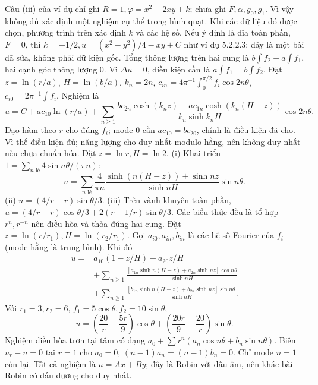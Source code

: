 Câu (iii) của ví dụ chỉ ghi $R=1,\varphi=x^2-2xy+k$; chưa ghi $F,\alpha,g_0,g_1$. Vì vậy không đủ xác định một nghiệm cụ thể trong hình quạt. Khi các dữ liệu đó được chọn, phương trình trên xác định $k$ và các hệ số. Nếu ý định là đĩa toàn phần, $F=0$, thì $k=-1/2,u=(x^2-y^2)/4-xy+C$ như ví dụ 5.2.2.3; đây là một bài đã sửa, không phải dữ kiện gốc.
Tổng thông lượng trên hai cung là $b\int f_2-a\int f_1$, hai cạnh góc thông lượng 0. Vì $\Delta u=0$, điều kiện cần là $a\int f_1=b\int f_2$. Đặt $z=\ln(r/a)$, $H=\ln(b/a)$, $k_n=2n$, $c_{in}=4\pi^{-1}\int_0^{\pi/2}f_i\cos2n\theta$, $c_{i0}=2\pi^{-1}\int f_i$. Nghiệm là
\[u=C+ac_{10}\ln(r/a)+\sum_{n\ge1}\frac{bc_{2n}\cosh(k_nz)-ac_{1n}\cosh(k_n(H-z))}{k_n\sinh k_nH}\cos2n\theta.\]
Đạo hàm theo $r$ cho đúng $f_i$; mode 0 cần $ac_{10}=bc_{20}$, chính là điều kiện đã cho. Vì thế điều kiện đủ; năng lượng cho duy nhất modulo hằng, nên không duy nhất nếu chưa chuẩn hóa.
Đặt $z=\ln r,H=\ln2$. (i) Khai triển $1=\sum_{n\text{ lẻ}}4\sin n\theta/(\pi n)$:
\[u=\sum_{n\text{ lẻ}}\frac4{\pi n}\frac{\sinh(n(H-z))+\sinh nz}{\sinh nH}\sin n\theta.\]
(ii) $u=(4/r-r)\sin\theta/3$.
(iii) Trên vành khuyên toàn phần, $u=(4/r-r)\cos\theta/3+2(r-1/r)\sin\theta/3$. Các biểu thức đều là tổ hợp $r^n,r^{-n}$ nên điều hòa và thỏa đúng hai cung.
Đặt $z=\ln(r/r_1),H=\ln(r_2/r_1)$. Gọi $a_{i0},a_{in},b_{in}$ là các hệ số Fourier của $f_i$ (mode hằng là trung bình). Khi đó
\begin{align*}
u={}&a_{10}(1-z/H)+a_{20}z/H\\
&+\sum_{n\ge1}\frac{[a_{1n}\sinh n(H-z)+a_{2n}\sinh nz]\cos n\theta}{\sinh nH}\\
&+\sum_{n\ge1}\frac{[b_{1n}\sinh n(H-z)+b_{2n}\sinh nz]\sin n\theta}{\sinh nH}.
\end{align*}
Với $r_1=3,r_2=6$, $f_1=5\cos\theta,f_2=10\sin\theta$,
\[u=\left(\frac{20}r-\frac{5r}9\right)\cos\theta+\left(\frac{20r}9-\frac{20}r\right)\sin\theta.\]
Nghiệm điều hòa trơn tại tâm có dạng $a_0+\sum r^n(a_n\cos n\theta+b_n\sin n\theta)$. Biên $u_r-u=0$ tại $r=1$ cho $a_0=0$, $(n-1)a_n=(n-1)b_n=0$. Chỉ mode $n=1$ còn lại. Tất cả nghiệm là $u=Ax+By$; đây là Robin với dấu âm, nên khác bài Robin có dấu dương cho duy nhất.
